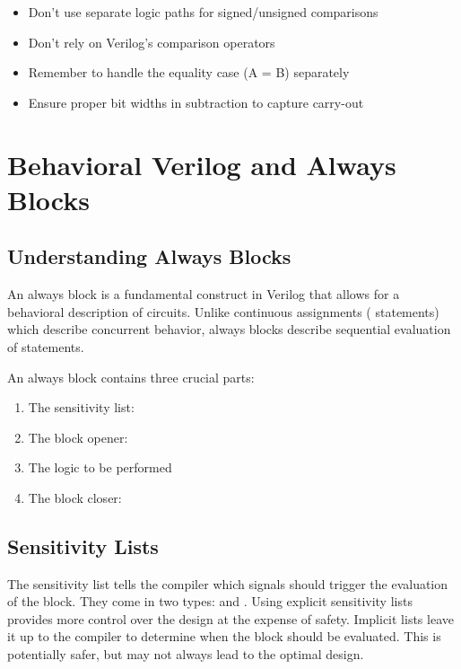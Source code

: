 \documentclass[12pt]{labmanual}
\begin{document}
\begin{extra}
\begin{itemize}
    \item Don't use separate logic paths for signed/unsigned comparisons
    \item Don't rely on Verilog's comparison operators
    \item Remember to handle the equality case (A = B) separately
    \item Ensure proper bit widths in subtraction to capture carry-out
\end{itemize}
\end{extra}

\section{Behavioral Verilog and Always Blocks}

\subsection{Understanding Always Blocks}

An always block is a fundamental construct in Verilog that allows for a behavioral description of circuits. Unlike continuous assignments ( statements) which describe concurrent behavior, always blocks describe sequential evaluation of statements.

An always block contains three crucial parts:
\begin{enumerate}
    \item The sensitivity list: 
    \item The block opener: 
    \item The logic to be performed 
    \item The block closer: 
\end{enumerate}

\subsection{Sensitivity Lists}

The sensitivity list tells the compiler which signals should trigger the evaluation of the  block. They come in two types:  and . Using explicit sensitivity lists provides more control over the design at the expense of safety. Implicit lists leave it up to the compiler to determine when the block should be evaluated. This is potentially safer, but may not always lead to the optimal design.
\end{document}

